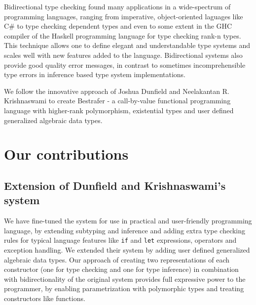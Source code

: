 \documentclass[declaration,shortabstract,english]{iithesis}
\begin{document}
Bidirectional type checking found many applications in a wide-spectrum of programming languages, ranging from
imperative, object-oriented laguages like C\# \cite{csharp2,csharp3} to type checking dependent types\cite{Coquand}
and even to some extent in the GHC compiler of the Haskell programming language for type checking rank-n types\cite{peytonjones}.
This technique allows one to define elegant and understandable type systems and scales well with new features added to the
language. Bidirectional systems also provide good quality error messages, in contrast to sometimes incomprehensible type errors
in inference based type system implementations.

We follow the innovative approach of Joshua Dunfield and Neelakantan R. Krishnaswami\cite{gadt-popl19} to create Bestrafer -
a call-by-value functional programming language with higher-rank polymorphism,
existential types and user defined generalized algebraic data types.
\section{Our contributions}
\subsection*{Extension of Dunfield and Krishnaswami's system}
We have fine-tuned the system for use in practical and user-friendly programming language, by
extending subtyping and inference and adding extra type checking rules for typical language features like \verb+if+
and \verb+let+ expressions, operators and exception handling. We extended their system by adding user defined
generalized algebraic data types. Our approach of creating two representations of each constructor
(one for type checking and one for type inference) in combination with bidirectionality of the original
system provides full expressive power to the programmer, by enabling parametrization with polymorphic types and
treating constructors like functions.
\end{document}
